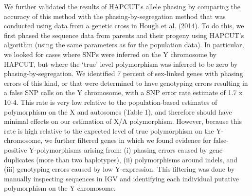 \documentclass[9pt,twocolumn,twoside]{gsajnl}
\begin{document}
We further validated the results of HAPCUT’s allele phasing by comparing the accuracy of this method with the phasing-by-segregation method that was conducted using data from a genetic cross in Hough et al. (2014). To do this, we first phased the sequence data from parents and their progeny using HAPCUT’s algorithm (using the same parameters as for the population data). In particular, we looked for cases where SNPs were inferred on the Y chromosome by HAPCUT, but where the ‘true’ level polymorphism was inferred to be zero by phasing-by-segregation. We identified 7 percent of sex-linked genes with phasing errors of this kind, or that were determined to have genotyping errors resulting in a false SNP calls on the Y chromosome, with a SNP error rate estimate of 1.7 x 10-4. This rate is very low relative to the population-based estimates of polymorphism on the X and autosomes (Table 1), and therefore should have minimal effects on our estimation of X/A polymorphism. However, because this rate is high relative to the expected level of true polymorphism on the Y-chromosome, we further filtered genes in which we found evidence for false-positive Y-polymorphisms arising from: (i) phasing errors caused by gene duplicates (more than two haplotypes), (ii) polymorphisms around indels, and (iii) genotyping errors caused by low Y-expression. This filtering was done by manually inspecting sequences in IGV \citep{robinson2011integrative} and identifying each individual putative polymorphism on the Y chromosome.
\end{document}
